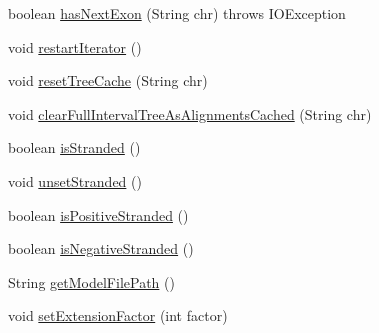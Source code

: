 \begin{DoxyCompactItemize}
\item 
boolean \hyperlink{interfacebroad_1_1pda_1_1seq_1_1segmentation_1_1_alignment_data_model_a42db8a50ee19446bcbf63df1a5c93608}{has\+Next\+Exon} (String chr)  throws I\+O\+Exception
\item 
void \hyperlink{interfacebroad_1_1pda_1_1seq_1_1segmentation_1_1_alignment_data_model_af88bb462936e995d07fc6eed496a619b}{restart\+Iterator} ()
\item 
void \hyperlink{interfacebroad_1_1pda_1_1seq_1_1segmentation_1_1_alignment_data_model_a2e3c8ba0de7c83333cb0ec6a7427aa3d}{reset\+Tree\+Cache} (String chr)
\item 
void \hyperlink{interfacebroad_1_1pda_1_1seq_1_1segmentation_1_1_alignment_data_model_a79e7e291a3c7f8594234974c673c953b}{clear\+Full\+Interval\+Tree\+As\+Alignments\+Cached} (String chr)
\item 
boolean \hyperlink{interfacebroad_1_1pda_1_1seq_1_1segmentation_1_1_alignment_data_model_ab10cf271be5d0c0dbebff5b7c5088085}{is\+Stranded} ()
\item 
void \hyperlink{interfacebroad_1_1pda_1_1seq_1_1segmentation_1_1_alignment_data_model_ac5a4a85a72e2b62181a6c9920e7779ce}{unset\+Stranded} ()
\item 
boolean \hyperlink{interfacebroad_1_1pda_1_1seq_1_1segmentation_1_1_alignment_data_model_add40b2ab02323c98f487bdf550bcf2ab}{is\+Positive\+Stranded} ()
\item 
boolean \hyperlink{interfacebroad_1_1pda_1_1seq_1_1segmentation_1_1_alignment_data_model_af12a10e456797cda37eeef9c19e7f99d}{is\+Negative\+Stranded} ()
\item 
String \hyperlink{interfacebroad_1_1pda_1_1seq_1_1segmentation_1_1_alignment_data_model_ade12353a8750a5517fda8f337c9a4f13}{get\+Model\+File\+Path} ()
\item 
void \hyperlink{interfacebroad_1_1pda_1_1seq_1_1segmentation_1_1_alignment_data_model_a9c9d0361b83f9772aa8e8b0536e9ef74}{set\+Extension\+Factor} (int factor)
\end{DoxyCompactItemize}



